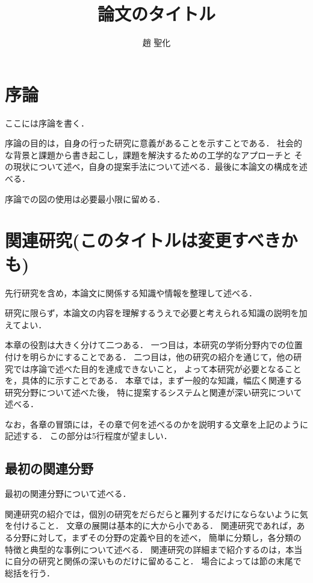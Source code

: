 \documentclass[book,paper=a4,fontsize=10pt,jafontscale=0.92]{jlreq}
\title{論文のタイトル} %
\author{趙 聖化} %
\begin{document}

\jtitlepage %
\clearpage %
\jabstractpage %
\clearpage %
\tableofcontents %
\clearpage %
\listoftables %
\clearpage %
\listoffigures %
\clearpage %

\chapter{序論}

ここには序論を書く．

序論の目的は，自身の行った研究に意義があることを示すことである．
社会的な背景と課題から書き起こし，課題を解決するための工学的なアプローチと
その現状について述べ，自身の提案手法について述べる．最後に本論文の構成を述べる．

序論での図の使用は必要最小限に留める．

\chapter{関連研究(このタイトルは変更すべきかも)}

先行研究を含め，本論文に関係する知識や情報を整理して述べる．

研究に限らず，本論文の内容を理解するうえで必要と考えられる知識の説明を加えてよい．

本章の役割は大きく分けて二つある．
一つ目は，本研究の学術分野内での位置付けを明らかにすることである．
二つ目は，他の研究の紹介を通じて，他の研究では序論で述べた目的を達成できないこと，
よって本研究が必要となることを，具体的に示すことである．
本章では，まず一般的な知識，幅広く関連する研究分野について述べた後，
特に提案するシステムと関連が深い研究について述べる．

なお，各章の冒頭には，その章で何を述べるのかを説明する文章を上記のように記述する．
この部分は5行程度が望ましい．

\section{最初の関連分野}

最初の関連分野について述べる．

関連研究の紹介では，個別の研究をだらだらと羅列するだけにならないように気を付けること．
文章の展開は基本的に大から小である．
関連研究であれば，ある分野に対して，まずその分野の定義や目的を述べ，
簡単に分類し，各分類の特徴と典型的な事例について述べる．
関連研究の詳細まで紹介するのは，本当に自分の研究と関係の深いものだけに留めること．
場合によっては節の末尾で総括を行う．
\end{document}
